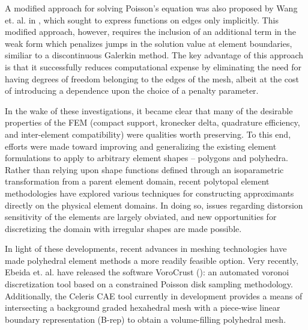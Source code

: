 	A modified approach for solving Poisson's equation was also proposed by Wang et. al. in \cite{Wang:14}, which sought to express functions on edges only implicitly. This modified approach, however, requires the inclusion of an additional term in the weak form which penalizes jumps in the solution value at element boundaries, similiar to a discontinuous Galerkin method. The key advantage of this approach is that it successfully reduces computational expense by eliminating the need for having degrees of freedom belonging to the edges of the mesh, albeit at the cost of introducing a dependence upon the choice of a penalty parameter.

	In the wake of these investigations, it became clear that many of the desirable properties of the FEM (compact support, kronecker delta, quadrature efficiency, and inter-element compatibility) were qualities worth preserving. To this end, efforts were made toward improving and generalizing the existing element formulations to apply to arbitrary element shapes -- polygons and polyhedra. Rather than relying upon shape functions defined through an isoparametric transformation from a parent element domain, recent polytopal element methodologies have explored various techniques for constructing approximants directly on the physical element domains. In doing so, issues regarding distorsion sensitivity of the elements are largely obviated, and new opportunities for discretizing the domain with irregular shapes are made possible.

	In light of these developments, recent advances in meshing technologies have made polyhedral element methods a more readily feasible option. Very recently, Ebeida et. al. have released the software VoroCrust (\cite{Ebeida:17}): an automated voronoi discretization tool based on a constrained Poisson disk sampling methodology. Additionally, the Celeris CAE tool currently in development provides a means of intersecting a background graded hexahedral mesh with a piece-wise linear boundary representation (B-rep) to obtain a volume-filling polyhedral mesh.

